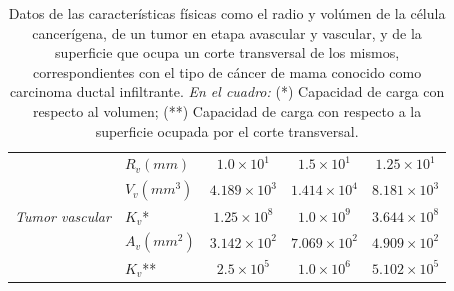 \begin{table}[!ht]
\begin{center}
{\begin{tabular}{|c|c|c|c|c|}
    & \multicolumn{1}{|l|}{$R_v(mm)$} & \multicolumn{1}{|c|}{$1$.$0 \times 10^1$} & \multicolumn{1}{|c|}{$1$.$5 \times 10^1$} & \multicolumn{1}{|c|}{$1$.$25 \times 10^1$} \\\cline{2-5}
    & \multicolumn{1}{|l|}{$V_v(mm^3)$} & \multicolumn{1}{|c|}{$4$.$189 \times 10^3$} & \multicolumn{1}{|c|}{$1$.$414 \times 10^4$} & \multicolumn{1}{|c|}{$8$.$181 \times 10^3$} \\\cline{2-5} 
\emph{Tumor vascular} & \multicolumn{1}{|l|}{$K_v$*} & \multicolumn{1}{|c|}{$1$.$25 \times 10^8$} & \multicolumn{1}{|c|}{$1$.$0 \times 10^9$}& \multicolumn{1}{|c|}{$3$.$644 \times 10^8$} \\\cline{2-5} 
    & \multicolumn{1}{|l|}{$A_v(mm^2)$} & \multicolumn{1}{|c|}{$3$.$142 \times 10^2$} & \multicolumn{1}{|c|}{$7$.$069 \times 10^2$} & \multicolumn{1}{|c|}{$4$.$909 \times 10^2$}\\\cline{2-5} 
    & \multicolumn{1}{|l|}{$K_v$**} & \multicolumn{1}{|c|}{$2$.$5 \times 10^5$} & \multicolumn{1}{|c|}{$1$.$0 \times 10^6$} & \multicolumn{1}{|c|}{$5$.$102 \times 10^5$}\\\hline
\end{tabular}}\vspace*{-0.5cm}
\end{center}
\caption[Datos de las caracter\'isticas f\'isicas como el radio y vol\'umen de la c\'elula cancer\'igena, de un tumor en etapa avascular y vascular, y de la superficie que ocupa un corte transversal de los mismos]{Datos de las caracter\'isticas f\'isicas como el radio y vol\'umen de la c\'elula cancer\'igena, de un tumor en etapa avascular y vascular, y de la superficie que ocupa un corte transversal de los mismos, correspondientes con el tipo de c\'ancer de mama conocido como carcinoma ductal infiltrante. \emph{En el cuadro:} (*) Capacidad de carga con respecto al volumen; (**) Capacidad de carga con respecto a la superficie ocupada por el corte transversal.}
\label{table-original-values}
\end{table}
    
